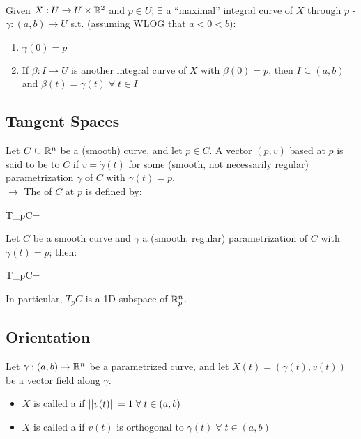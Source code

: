 \documentclass[13pt]{extarticle}
\begin{document}
~\\[-18pt]
\begin{thm}
    Given $X:U\to U\times\mathbb{R}^2$ and $p\in U$, $\exists$ a ``maximal'' integral curve of $X$ through $p$ - $\gamma:(a,b)\to U$ s.t. (assuming WLOG that $a<0<b$): \begin{enumerate}
        \item $\gamma(0)=p$
        \item If $\beta:I\to U$ is another integral curve of $X$ with $\beta(0)=p$, then $I\subseteq(a,b)$ and $\beta(t)=\gamma(t)\;\forall\;t\in I$
    \end{enumerate}
\end{thm}

\newp
\subsection{Tangent Spaces}
\begin{definition}
    Let $C\subseteq\mathbb{R}^n$ be a (smooth) curve, and let $p\in C$. A vector $(p,v)$ based at $p$ is said to be  to $C$ if $v=\dot\gamma(t)$ for some (smooth, not necessarily regular) parametrization $\gamma$ of $C$ with $\gamma(t)=p$. \\[-4pt]

    $\rightarrow$ The  of $C$ at $p$ is defined by: \begin{eqnbox}
        T_pC=
    \end{eqnbox}
\end{definition}

\begin{prop}
    Let $C$ be a smooth curve and $\gamma$ a (smooth, regular) parametrization of $C$ with $\gamma(t)=p$; then: \begin{eqnbox}
        T_pC=
    \end{eqnbox}
    In particular, $T_pC$ is a 1D subspace of $\mathbb{R}_p^n$.
\end{prop}

\newp
\subsection{Orientation}
\begin{definition}
    Let $\gamma:(a,b)\to\mathbb{R}^n$ be a parametrized curve, and let $X(t)=(\gamma(t),v(t))$ be a vector field along $\gamma$. \begin{itemize}
        \item $X$ is called a  if $\left|\left|v(t)\right|\right|=1\;\forall\;t\in(a,b)$
        \item $X$ is called a  if $v(t)$ is orthogonal to $\dot\gamma(t)\;\forall\;t\in(a,b)$
    \end{itemize}
\end{definition}
\end{document}
